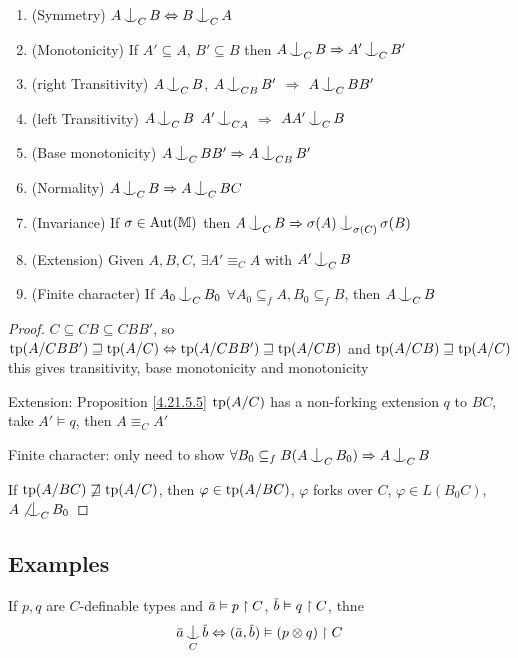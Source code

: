 \documentclass[11pt]{article}
\begin{document}
\begin{proposition}[]
\label{4.28.10.6}
\begin{enumerate}
\item (Symmetry) \(A\ind_CB\Leftrightarrow B\ind_CA\)
\item (Monotonicity) If \(A'\subseteq A\), \(B'\subseteq B\) then \(A\ind_CB\Rightarrow A'\ind_CB'\)
\item (right Transitivity) \(A\ind_CB\), \(A\ind_{CB}B'\) \(\Rightarrow\) \(A\ind_CBB'\)
\item (left Transitivity) \(A\ind_CB\) \(A'\ind_{CA}\) \(\Rightarrow\) \(AA'\ind_CB\)
\item (Base monotonicity) \(A\ind_C BB'\Rightarrow A\ind_{CB}B'\)
\item (Normality) \(A\ind_CB\Rightarrow A\ind_CBC\)
\item (Invariance) If \(\sigma\in\operatorname{\text{Aut}}(\mathbb{M})\) then \(A\ind_CB\Rightarrow\sigma(A)\ind_{\sigma(C)}\sigma(B)\)
\item (Extension) Given \(A,B,C\), \(\exists A'\equiv_CA\) with \(A'\ind_CB\)
\item (Finite character) If \(A_0\ind_CB_0\) \(\forall A_0\subseteq_fA,B_0\subseteq_fB\), then \(A\ind_CB\)
\end{enumerate}
\end{proposition}

\begin{proof}
\(C\subseteq CB\subseteq CBB'\), so \(\operatorname{tp}(A/CBB')\sqsupseteq\operatorname{tp}(A/C)\Leftrightarrow\operatorname{tp}(A/CBB')\sqsupseteq\operatorname{tp}(A/CB)\) and
\(\operatorname{tp}(A/CB)\sqsupseteq\operatorname{tp}(A/C)\)
this gives transitivity, base monotonicity and monotonicity

Extension: Proposition \ref{4.21.5.5} \(\operatorname{tp}(A/C)\) has a non-forking extension \(q\) to \(BC\),
take \(A'\vDash q\), then \(A\equiv_CA'\)

Finite character: only need to show \(\forall B_0\subseteq_fB(A\ind_CB_0)\Rightarrow A\ind_CB\)

If \(\operatorname{tp}(A/BC)\not\sqsupseteq\operatorname{tp}(A/C)\), then \(\varphi\in\operatorname{tp}(A/BC)\), \(\varphi\) forks over \(C\), \(\varphi\in L(B_0C)\), \(A\not\ind_CB_0\)
\end{proof}

\subsection{Examples}
\label{sec:orgde73c21}
\begin{proposition}[]
If \(p,q\) are \(C\)-definable types and \(\bara\vDash p\uhr C\), \(\barb\vDash q\uhr C\), thne
\begin{equation*}
\bara\ind_C\barb\Leftrightarrow(\bara,\barb)\vDash(p\otimes q)\uhr C
\end{equation*}
\end{proposition}
\end{document}
